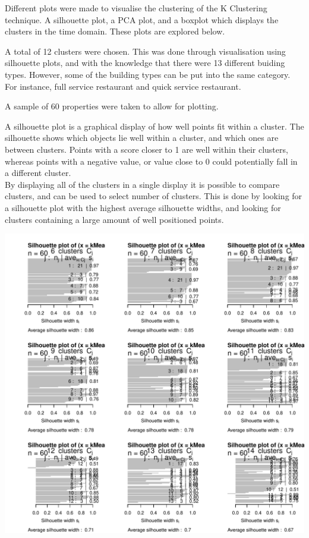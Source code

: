 \documentclass[12pt]{article}\usepackage[]{graphicx}\usepackage[]{color}
\makeatletter
\def\maxwidth{ %
  \ifdim\Gin@nat@width>\linewidth
    \linewidth
  \else
    \Gin@nat@width
  \fi
}
\newenvironment{knitrout}{}{} %
\makeatother
\begin{document}
Different plots were made to visualise the clustering of the K Clustering technique. A silhouette plot, a PCA plot, and a boxplot which displays the clusters in the time domain. These plots are explored below. 

A total of 12 clusters were chosen. This was done through visualisation using silhouette plots, and with the knowledge that there were 13 different buiding types. However, some of the building types can be put into the same category. For instance, full service restaurant and quick service restaurant.

A sample of 60 properties were taken to allow for plotting. 




A silhouette plot is a graphical display of how well points fit within a cluster. The silhouette shows which objects lie well within a cluster, and which ones are between clusters. Points with a score closer to 1 are well within their clusters, whereas points with a negative value, or value close to 0 could potentially fall in a different cluster.\\

By displaying all of the clusters in a single display it is possible to compare clusters, and can be used to select number of clusters. This is done by looking for a silhouette plot with the highest average silhouette widths, and looking for clusters containing a large amount of well positioned points. \cite{Rousseeuw1987}

\begin{knitrout}
\color{fgcolor}
\includegraphics[width=\maxwidth]{figure/silhouette_k_plots-1} 

\end{knitrout}
\end{document}
